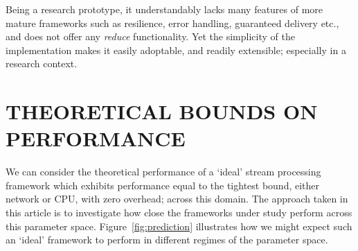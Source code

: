 \documentclass[conference]{IEEEtran}
\begin{document}
Being a research prototype, it understandably lacks many features of more mature frameworks such as resilience, error handling, guaranteed delivery etc., and does not offer any \emph{reduce} functionality. Yet the simplicity of the implementation makes it easily adoptable, and readily extensible; especially in a research context.




\section{THEORETICAL BOUNDS ON PERFORMANCE}\label{theobounds}

We can consider the theoretical performance of a `ideal' stream processing framework which exhibits performance equal to the tightest bound, either network or CPU, with zero overhead; across this domain. The approach taken in this article is to investigate how close the frameworks under study perform across this parameter space.  
Figure~\ref{fig:prediction} illustrates how we might expect such an `ideal' framework to perform in different regimes of the parameter space. 
\end{document}
